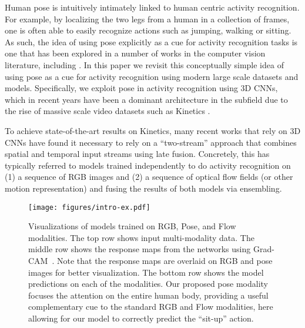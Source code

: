 \documentclass[10pt,twocolumn,letterpaper]{article}
\begin{document}
Human pose  is intuitively intimately linked to human centric activity recognition.  For  example,  by  localizing the two  legs from  a  human  in  a  collection  of  frames, one is often able to easily recognize actions such  as  jumping,  walking  or  sitting.  As such, the idea of using pose explicitly as a cue for activity recognition tasks is one that has been explored in a number of works in the computer vision literature, including \cite{cheron2015p,potion2018,crasto2019mars,LGD_3D,angelayao_bmvc_2011_pose}. In this paper we revisit this conceptually simple idea of using pose as a cue for activity recognition using modern large scale datasets and models.  Specifically, we exploit pose in activity recognition using 3D CNNs, which in recent years have been a dominant architecture in the subfield due to the rise of massive scale video datasets such as Kinetics \cite{carreira2019short,carreira2017quo,kay2017kinetics}.

To achieve state-of-the-art results on Kinetics, many recent works that rely on 3D CNNs \cite{taylor2010convolutional,tran2015learning} have found it necessary to rely on a “two-stream” approach \cite{Simonyan2} that combines spatial and temporal input streams using late fusion.  Concretely, this has typically referred to models trained independently to do activity recognition on (1) a sequence of RGB images and (2) a sequence of optical flow fields (or other motion representation) and fusing the results of both models via ensembling.


\begin{figure}
\centering
\texttt{[image: figures/intro-ex.pdf]}
\caption{Visualizations of models trained on RGB, Pose, and Flow modalities. The top row shows input multi-modality data. The middle row shows the response maps from the networks using Grad-CAM~\cite{selvaraju2017grad}. Note that the response maps are overlaid on RGB and pose images for better visualization. The bottom row shows the model predictions on each of the modalities. Our proposed pose modality focuses the attention on the entire human body, providing a useful complementary cue to the standard RGB and Flow modalities, here allowing for our model to correctly predict the ``sit-up'' action.}
\label{fig:pose-intro}
\vspace{-0.5cm}
\end{figure}
\end{document}
